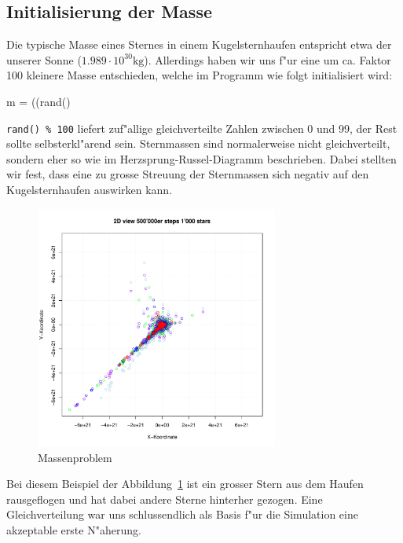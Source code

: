 \begin{refsection}
\subsection{Initialisierung der Masse \label{kugel:subsection:InitMasse}}
Die typische Masse eines Sternes in einem Kugelsternhaufen entspricht
etwa der unserer Sonne ($\mathrm{1.989 \cdot 10^{30} kg}$). Allerdings
haben wir uns f"ur eine um ca. Faktor 100 kleinere Masse entschieden,
welche im Programm wie folgt initialisiert wird:
\begin{Cpp}
m = ((rand()%
\end{Cpp}
\texttt{rand()  \% 100} liefert zuf"allige gleichverteilte Zahlen
zwischen 0 und 99, der Rest sollte selbsterkl"arend sein. Sternmassen
sind normalerweise nicht gleichverteilt, sondern eher so wie im
Herzsprung-Russel-Diagramm beschrieben. Dabei stellten wir fest, dass eine
zu grosse Streuung der Sternmassen sich negativ auf den Kugelsternhaufen
auswirken kann.\\
\begin{figure}[h!]
	\begin{center}
		\includegraphics[width = 8cm]{kugel/images/lolli.pdf}
	\end{center}
	\caption{Massenproblem
	\label{Kugel.Massenproblem}}
\end{figure}

Bei diesem Beispiel der Abbildung~\ref{Kugel.Massenproblem} ist ein
grosser Stern aus dem Haufen rausgeflogen und hat dabei andere Sterne
hinterher gezogen. Eine Gleichverteilung war uns schlussendlich als
Basis f"ur die Simulation eine akzeptable erste N"aherung.
	

\end{refsection}
